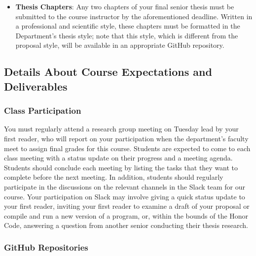 \documentclass[11pt]{article}
\begin{document}
\begin{itemize}
  \item {\bf Thesis Chapters}: Any two chapters of your final senior thesis must be submitted to the course instructor by the aforementioned deadline. Written in a professional and scientific style, these chapters must be formatted in the Department's thesis style; note that this style, which is different from the proposal style, will be available in an appropriate GitHub repository.

\end{itemize}

\subsection*{Details About Course Expectations and Deliverables}

\subsubsection*{Class Participation}

You must regularly attend a research group meeting on Tuesday lead by your first reader, who will report on your participation when the department's faculty meet to assign final grades for this course. Students are expected to come to each class meeting with a status update on their progress and a meeting agenda. Students should conclude each meeting by listing the tasks that they want to complete before the next meeting. In addition, students should regularly participate in the discussions on the relevant channels in the Slack team for our course. Your participation on Slack may involve giving a quick status update to your first reader, inviting your first reader to examine a draft of your proposal or
compile and run a new version of a program, or, within the bounds of the Honor Code, answering a question from another senior conducting their thesis research.


\subsubsection*{GitHub Repositories}
\end{document}
